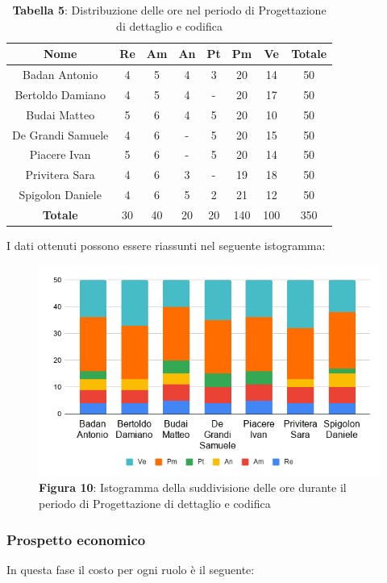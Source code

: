 \begin{table}[H]
	\centering
	\renewcommand{\arraystretch}{1.5}
	\begin{tabular}{|c|c|c|c|c|c|c|c|}
		\hline
		\rowcolor{lighter-grayer}
Nome & Re & Am & An & Pt & Pm & Ve & Totale \\ \hline
Badan Antonio & 4 & 5 & 4 & 3 & 20 & 14 & 50 \\ \hline
Bertoldo Damiano & 4 & 5 & 4 & - & 20 & 17 & 50 \\ \hline
Budai Matteo & 5 & 6 & 4 & 5 & 20 & 10 & 50 \\ \hline
De Grandi Samuele & 4 & 6 & - & 5 & 20 & 15 & 50 \\ \hline
Piacere Ivan & 5 & 6 & - & 5 & 20 & 14 & 50 \\ \hline
Privitera Sara & 4 & 6 & 3 & - & 19 & 18 & 50 \\ \hline
Spigolon Daniele & 4 & 6 & 5 & 2 & 21 & 12 & 50 \\ \hline
\textbf{Totale} & 30 & 40 & 20 & 20 & 140 & 100 & 350 \\ \hline
	\end{tabular}
	\caption*{\textbf{Tabella 5}: Distribuzione delle ore nel periodo di Progettazione di dettaglio e codifica\\}
\end{table}	
I dati ottenuti possono essere riassunti nel seguente istogramma:

\begin{figure}[H]
	\centering
	\includegraphics[width=0.7\linewidth]{res/images/IstogrammaFase3.png}
	\caption*{\textbf{Figura 10}: Istogramma della suddivisione delle ore durante il periodo di Progettazione di dettaglio e codifica}
	\label{fig:Figura10}
\end{figure}


\subsubsection{Prospetto economico}
In questa fase il costo per ogni ruolo è il seguente:

